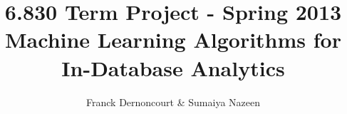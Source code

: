 \documentclass[10pt]{article}
\begin{document}
\title{{\small 6.830 Term Project - Spring 2013}\\Machine Learning Algorithms for In-Database Analytics}
\author{Franck Dernoncourt \& Sumaiya Nazeen}
\maketitle 


 
 





 
\end{document}
